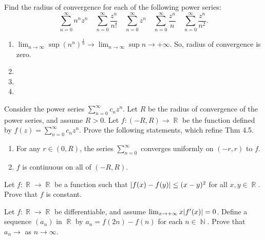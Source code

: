 \documentclass[12pt,letterpaper,boxed]{hmcpset}
\DeclareMathOperator{\N}{\mathbb{N}}
\DeclareMathOperator{\R}{\mathbb{R}}
\DeclarePairedDelimiter\abs{\lvert}{\rvert}%
\begin{document}
\begin{problem}[Exercise 4.6]
Find the radius of convergence for each of the following power series: $$
\sum_{n=0}^{\infty} n^{n} z^{n} \quad \sum_{n=0}^{\infty} \frac{z^{n}}{n !} \quad \sum_{n=0}^{\infty} z^{n} \quad \sum_{n=0}^{\infty} \frac{z^{n}}{n} \quad \sum_{n=0}^{\infty} \frac{z^{n}}{n^{2}}
.$$
\end{problem}

\begin{solution}
\begin{enumerate}
    \item $\lim_{n \rightarrow \infty}\sup (n^{n})^{\frac{1}{n}} \rightarrow \lim_{n \rightarrow \infty}\sup n\rightarrow +\infty$. So, radius of convergence is zero.
    \item 
    \item 
    \item 
\end{enumerate}
\end{solution}


\begin{problem}[Exercise 4.7]
Consider the power series $\sum_{n=0}^{\infty} c_nz^{n}$. Let $R$ be the radius of convergence of the power series, and assume $R>0$. Let $f: (-R,R) \rightarrow \R$ be the function defined by $f(z)=\sum_{n=0}^{\infty} c_nz^{n}$. Prove the following statements, which refine Thm 4.5.
\begin{enumerate}
    \item For any $r \in (0, R)$, the series $\sum_{n=0}^{\infty}$ converges uniformly on $(-r, r)$ to $f$.
    \item $f$ is continuous on all of $(-R,R)$.
\end{enumerate}
\end{problem}


\begin{solution}
\end{solution}


\begin{problem}[Exercise 1.5]
Let $f: \R \rightarrow \R$ be a function such that $\abs{f(x) - f(y)} \leq (x - y)^{2}$ for all $x, y \in \R.$ Prove that $f$ is constant.
\end{problem}

\begin{solution}

\end{solution}

\begin{problem}[Exercise 1.11]
Let $f: \R \rightarrow \R$ be differentiable, and assume $\lim_{x \rightarrow +\infty}x\abs{f'(x)}=0$. Define a sequence $(a_n)$ in $\R$ by $a_n = f(2n) -f(n)$ for each $n \in \N$. Prove that $a_n \rightarrow$ as $n\rightarrow\infty$.
\end{problem}
\end{document}
